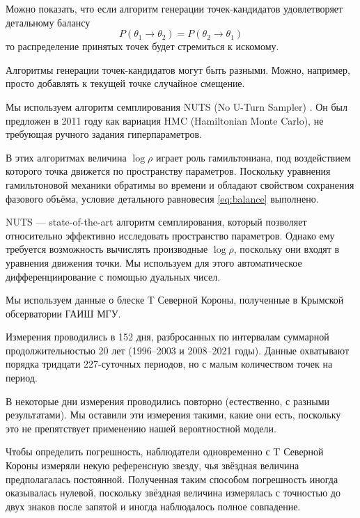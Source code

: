 Можно показать, что если алгоритм генерации точек-кандидатов удовлетворяет детальному балансу
\begin{equation}
P(\theta_1 \to \theta_2) = P(\theta_2 \to \theta_1)
\label{eq:balance}
\end{equation}
то распределение принятых точек будет стремиться к искомому.

Алгоритмы генерации точек-кандидатов могут быть разными. Можно, например, просто добавлять к текущей точке случайное смещение.

Мы используем алгоритм семплирования NUTS (No U-Turn Sampler) \cite{NUTS}. Он был предложен в 2011 году как вариация HMC (Hamiltonian Monte Carlo), не требующая ручного задания гиперпараметров.

В этих алгоритмах величина $\log \rho$ играет роль гамильтониана, под воздействием которого точка движется по пространству параметров. Поскольку уравнения гамильтоновой механики обратимы во времени и обладают свойством сохранения фазового объёма, условие детального равновесия \eqref{eq:balance} выполнено.

NUTS --- state-of-the-art алгоритм семплирования, который позволяет относительно эффективно исследовать пространство параметров. Однако ему требуется возможность вычислять производные $\log \rho$, поскольку они входят в уравнения движения точки. Мы используем для этого автоматическое дифференциирование с помощью дуальных чисел.




\label{sect:Brilliance}

Мы используем данные о блеске T Северной Короны, полученные в Крымской обсерватории ГАИШ МГУ.

Измерения проводились в 152 дня, разбросанных по интервалам суммарной продолжительностью 20 лет (1996--2003 и 2008--2021 годы). Данные охватывают порядка тридцати 227-суточных периодов, но с малым количеством точек на период.

В некоторые дни измерения проводились повторно (естественно, с разными результатами). Мы оставили эти измерения такими, какие они есть, поскольку это не препятствует применению нашей вероятностной модели.


Чтобы определить погрешность, наблюдатели одновременно с T Северной Короны измеряли некую референсную звезду, чья звёздная величина предполагалась постоянной. Полученная таким способом погрешность иногда оказывалась нулевой, поскольку звёздная величина измерялась с точностью до двух знаков после запятой и иногда наблюдалось полное совпадение.


